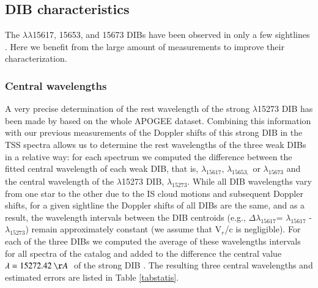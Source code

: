 \documentclass[printer]{aa} %
\begin{document}
\subsection{DIB characteristics \label{DIBcharac}}

The $\lambda\lambda$15617, 15653, and 15673 DIBs have been observed in only a few sightlines \citep{Geballe11,Cox14}.  Here we benefit from the large amount of measurements to improve their characterization.  

\subsubsection{Central wavelengths}
A very precise determination of the rest wavelength of the strong $\lambda$15273 DIB has been made by \cite{Zasowski15} based on the whole APOGEE dataset. Combining this information with our previous measurements of the Doppler shifts of this strong DIB in the TSS spectra \citep{Elyajouri16} allows us to determine the rest wavelengths of the three weak DIBs in a relative way: for each spectrum we computed  the difference between the fitted central wavelength of each weak DIB, that is, $\lambda _{15617}$, $\lambda _{15653,}$ or $\lambda _{15673}$ and the central wavelength of the $\lambda$15273 DIB, $\lambda _{15273}$. While all DIB wavelengths vary from one star to the other due to the IS cloud motions and subsequent Doppler shifts, for a given sightline the Doppler shifts of all DIBs are the same, and as a result, the wavelength intervals between the DIB centroids (e.g., $\Delta \lambda _{15617}$= $\lambda _{15617}$ -$\lambda _{15273}$) remain approximately constant (we assume that V$_{r}$/c is negligible). For each of the three DIBs we computed the average of these wavelengths intervals for all spectra of the catalog and added to the difference the central value $\lambda = 15272.42 \:\AA\ $ of the strong DIB \citep{Zasowski15}. 
The resulting three central wavelengths and estimated errors are listed in Table \ref{tabstatis}. 
\end{document}
